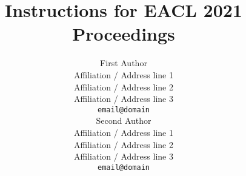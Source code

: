 \documentclass[11pt,a4paper]{article}
\title{Instructions for EACL 2021 Proceedings}
\author{First Author \\
  Affiliation / Address line 1 \\
  Affiliation / Address line 2 \\
  Affiliation / Address line 3 \\
  \texttt{email@domain} \\\And
  Second Author \\
  Affiliation / Address line 1 \\
  Affiliation / Address line 2 \\
  Affiliation / Address line 3 \\
  \texttt{email@domain} \\}
\date{}
\begin{document}
\maketitle


\begin{abstract}
	
\end{abstract}










% 
% 





\appendix


\appendix


\end{document}
